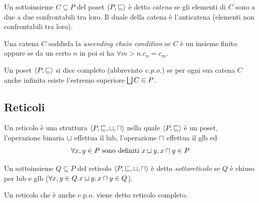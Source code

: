 \begin{definition}
Un sottoinsieme $C \subseteq P$ del poset $\langle P, \sqsubseteq \rangle$ è detto \emph{catena} se gli elementi di $C$ sono a due a due confrontabili tra loro. Il duale della catena è l'anticatena (elementi non confrontabili tra loro).  
\end{definition}

\begin{definition}
Una catena $C$ soddisfa la \emph{ascending chain condition} se $C$ è un insieme finito oppure se da un certo $n$ in poi si ha $\forall m > n . c_n = c_m$.
\end{definition}

\begin{definition}
Un poset $\langle P, \sqsubseteq \rangle$ si dice completo (abbreviato \emph{c.p.o.}) se per ogni sua catena $C$ anche infinita esiste l'estremo superiore $\join[C] \in P$.
\end{definition}

\subsection{Reticoli}\label{sec:reticoli}

\begin{definition}
Un reticolo è una struttura $\struct{P, \sqsubseteq, \join, \meet}$ nella quale $\langle P, \sqsubseteq \rangle$ è un poset, l'operazione binaria $\join$ effettua il lub, l'operazione $\meet$ effettua il glb ed 
\[ \forall x,y \in P \text{ sono definiti } \join[x][y], \meet[x][y] \in P \]
\end{definition}

\begin{definition}
Un sottoinsieme $Q \subseteq P$ del reticolo $\struct{P, \sqsubseteq, \join, \meet}$ è detto \emph{sottoreticolo} se $Q$ è chiuso per lub e glb ($\forall x,y \in Q . \join[x][y], \meet[x][y] \in Q$). 
\end{definition}

\begin{definition}
Un reticolo che è anche c.p.o. viene detto reticolo completo.
\end{definition}

